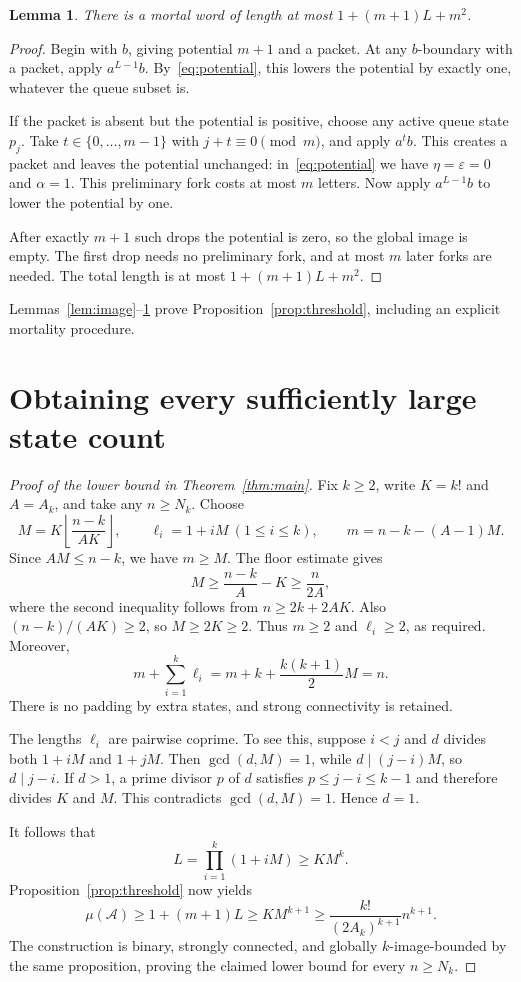 \documentclass[acmsmall,screen,nonacm,11pt]{acmart}
\newtheorem{lemma}[theorem]{Lemma}
\newcommand{\calA}{\mathcal{A}}
\begin{document}
\begin{lemma}\label{lem:mortal}
There is a mortal word of length at most $1+(m+1)L+m^2$.
\end{lemma}
\begin{proof}
Begin with $b$, giving potential $m+1$ and a packet. At any $b$-boundary
with a packet, apply $a^{L-1}b$. By~\eqref{eq:potential}, this lowers the
potential by exactly one, whatever the queue subset is.

If the packet is absent but the potential is positive, choose any active
queue state $p_j$. Take $t\in\{0,\ldots,m-1\}$ with $j+t\equiv0\pmod m$,
and apply $a^t b$. This creates a packet and leaves the potential unchanged:
in~\eqref{eq:potential} we have $\eta=\varepsilon=0$ and $\alpha=1$.
This preliminary fork costs at most $m$ letters. Now apply $a^{L-1}b$ to
lower the potential by one.

After exactly $m+1$ such drops the potential is zero, so the global image
is empty. The first drop needs no preliminary fork, and at most $m$ later
forks are needed. The total length is at most $1+(m+1)L+m^2$.
\end{proof}

Lemmas~\ref{lem:image}--\ref{lem:mortal} prove
Proposition~\ref{prop:threshold}, including an explicit mortality procedure.

\section{Obtaining every sufficiently large state count}

\begin{proof}[Proof of the lower bound in Theorem~\ref{thm:main}]
Fix $k\geq2$, write $K=k!$ and $A=A_k$, and take any $n\geq N_k$.
Choose
\begin{equation}\label{eq:parameters}
 M=K\left\lfloor\frac{n-k}{AK}\right\rfloor,\qquad
 \ell_i=1+iM\ (1\leq i\leq k),\qquad
 m=n-k-(A-1)M.
\end{equation}
Since $AM\leq n-k$, we have $m\geq M$. The floor estimate gives
\[
 M\geq\frac{n-k}{A}-K\geq\frac{n}{2A},
\]
where the second inequality follows from $n\geq2k+2AK$.
Also $(n-k)/(AK)\geq2$, so $M\geq2K\geq2$.
Thus $m\geq2$ and $\ell_i\geq2$, as required. Moreover,
\[
 m+\sum_{i=1}^k\ell_i
 =m+k+\frac{k(k+1)}2M=n.
\]
There is no padding by extra states, and strong connectivity is retained.

The lengths $\ell_i$ are pairwise coprime. To see this, suppose $i<j$
and $d$ divides both $1+iM$ and $1+jM$. Then $\gcd(d,M)=1$, while
$d\mid(j-i)M$, so $d\mid j-i$. If $d>1$, a prime divisor $p$ of $d$
satisfies $p\leq j-i\leq k-1$ and therefore divides $K$ and $M$.
This contradicts $\gcd(d,M)=1$. Hence $d=1$.

It follows that
\[
 L=\prod_{i=1}^k(1+iM)\geq K M^k.
\]
Proposition~\ref{prop:threshold} now yields
\[
 \mu(\calA)\geq1+(m+1)L
 \geq K M^{k+1}
 \geq\frac{k!}{(2A_k)^{k+1}}n^{k+1}.
\]
The construction is binary, strongly connected, and globally
$k$-image-bounded by the same proposition, proving the claimed lower bound
for every $n\geq N_k$.
\end{proof}
\end{document}
